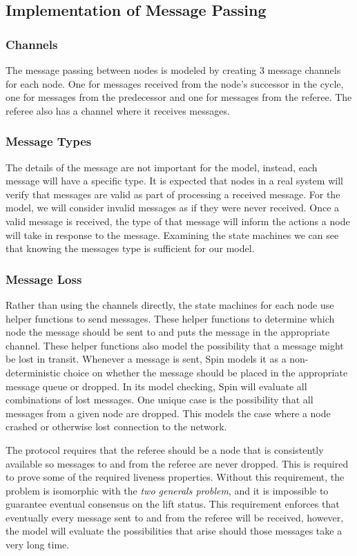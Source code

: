 \documentclass[runningheads]{llncs}
\begin{document}
\subsection{Implementation of Message Passing}
\subsubsection{Channels}
The message passing between nodes is modeled by creating 3 message channels for each node. One for messages received from the node's successor in the cycle, one for messages from the predecessor and one for messages from the referee. The referee also has a channel where it receives messages.

\subsubsection{Message Types}
The details of the message are not important for the model, instead, each message will have a specific type. It is expected that nodes in a real system will verify that messages are valid as part of processing a received message. For the model, we will consider invalid messages as if they were never received. Once a valid message is received, the type of that message will inform the actions a node will take in response to the message. Examining the state machines we can see that knowing the messages type is sufficient for our model. 

\subsubsection{Message Loss}
Rather than using the channels directly, the state machines for each node use helper functions to send messages. These helper functions to determine which node the message should be sent to and puts the message in the appropriate channel. These helper functions also model the possibility that a message might be lost in transit. Whenever a message is sent, Spin models it as a non-deterministic choice on whether the message should be placed in the appropriate message queue or dropped. In its model checking, Spin will evaluate all combinations of lost messages. One unique case is the possibility that all messages from a given node are dropped. This models the case where a node crashed or otherwise lost connection to the network. 

The protocol requires that the referee should be a node that is consistently available so messages to and from the referee are never dropped. This is required to prove some of the required liveness properties. Without this requirement, the problem is isomorphic with the \emph{two generals problem}, and it is impossible to guarantee eventual consensus on the lift status. This requirement enforces that eventually every message sent to and from the referee will be received, however, the model will evaluate the possibilities that arise should those messages take a very long time. 
\end{document}
